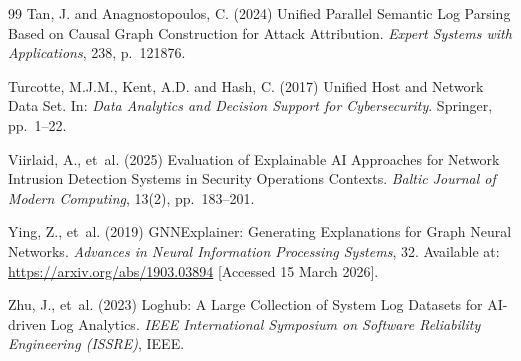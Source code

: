 \documentclass[12pt,a4paper]{report}
\begin{document}
\begin{thebibliography}{99}
Tan, J. and Anagnostopoulos, C. (2024) Unified Parallel Semantic Log Parsing Based on Causal Graph Construction for Attack Attribution. \textit{Expert Systems with Applications}, 238, p.~121876.

Turcotte, M.J.M., Kent, A.D. and Hash, C. (2017) Unified Host and Network Data Set. In: \textit{Data Analytics and Decision Support for Cybersecurity}. Springer, pp.~1--22.

Viirlaid, A., et~al. (2025) Evaluation of Explainable AI Approaches for Network Intrusion Detection Systems in Security Operations Contexts. \textit{Baltic Journal of Modern Computing}, 13(2), pp.~183--201.

Ying, Z., et~al. (2019) GNNExplainer: Generating Explanations for Graph Neural Networks. \textit{Advances in Neural Information Processing Systems}, 32. Available at: \url{https://arxiv.org/abs/1903.03894} [Accessed 15 March 2026].

Zhu, J., et~al. (2023) Loghub: A Large Collection of System Log Datasets for AI-driven Log Analytics. \textit{IEEE International Symposium on Software Reliability Engineering (ISSRE)}, IEEE.

\end{thebibliography}
\end{document}

